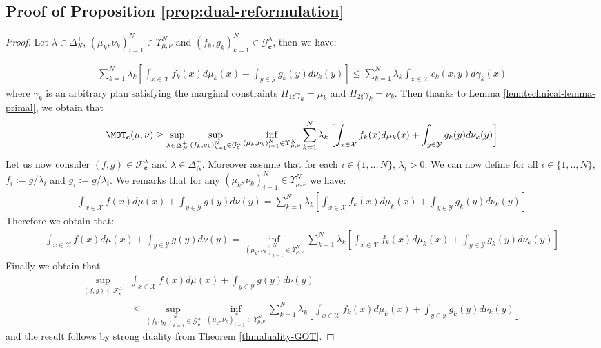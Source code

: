 \subsection{Proof of Proposition \ref{prop:dual-reformulation}}
\label{app:dual-reformulation}
\begin{proof}
Let $\lambda\in\Delta_N^{+}$, $(\mu_k,\nu_k)_{i=1}^N\in\Upsilon_{\mu,\nu}^N$ and $(f_k,g_k)_{k=1}^N\in  \mathcal{G}^{\lambda}_{\mathbf{c}}$, then we have:

\begin{align*}
    \sum_{k=1}^N \lambda_k \left[\int_{x\in\mathcal{X}} f_k(x)d\mu_k(x)+ \int_{y\in\mathcal{Y}} g_k(y)d\nu_k(y)\right] \leq   \sum_{k=1}^N \lambda_k \int_{x\in\mathcal{X}} c_k(x,y)d\gamma_k(x)
\end{align*}
where $\gamma_k$ is an arbitrary plan satisfying the marginal constraints $\Pi_{1\sharp}\gamma_k=\mu_k$ and $\Pi_{2\sharp}\gamma_k=\nu_k$.
Then thanks to Lemma \ref{lem:technical-lemma-primal}, we obtain that 
\begin{align*}
   \MOT_{\mathbf{c}}(\mu,\nu) \geq \sup_{\lambda\in\Delta_N^{+}} \sup\limits_{(f_k,g_k)_{k=1}^N\in  \mathcal{G}^{\lambda}_{\mathbf{c}}} \inf_{(\mu_k,\nu_k)_{i=1}^N\in\Upsilon_{\mu,\nu}^N } \sum_{k=1}^N \lambda_k \left[\int_{x\in\mathcal{X}} f_k(x)d\mu_k(x)+ \int_{y\in\mathcal{Y}} g_k(y)d\nu_k(y)\right]
\end{align*}
Let us now consider $(f,g)\in \mathcal{F}^{\lambda}_{\mathbf{c}}$ and $\lambda\in\Delta_N^{+}$. Moreover assume that for each $i\in\{1,..,N\}$, $\lambda_i>0$. We can now define for all $i\in\{1,..,N\}$, $f_i:= g/\lambda_i$ and $g_i:= g/\lambda_i$. We remarks that for any $(\mu_k,\nu_k)_{i=1}^N\in\Upsilon_{\mu,\nu}^N$ we have:
\begin{align*}
    \int_{x\in\mathcal{X}} f(x)d\mu(x)+ \int_{y\in\mathcal{Y}} g(y)d\nu(y) = \sum_{k=1}^N \lambda_k \left[\int_{x\in\mathcal{X}} f_k(x)d\mu_k(x)+ \int_{y\in\mathcal{Y}} g_k(y)d\nu_k(y)\right]
\end{align*}
Therefore we obtain that:
\begin{align*}
    \int_{x\in\mathcal{X}} f(x)d\mu(x)+ \int_{y\in\mathcal{Y}} g(y)d\nu(y) = \inf_{(\mu_k,\nu_k)_{i=1}^N\in\Upsilon_{\mu,\nu}^N } \sum_{k=1}^N \lambda_k \left[\int_{x\in\mathcal{X}} f_k(x)d\mu_k(x)+ \int_{y\in\mathcal{Y}} g_k(y)d\nu_k(y)\right]
\end{align*}
Finally we obtain that 
\begin{align*}
   \sup\limits_{(f,g)\in\mathcal{F}_{\mathbf{c}}^{\lambda}}& \int_{x\in\mathcal{X}} f(x)d\mu(x)+ \int_{y\in\mathcal{Y}} g(y)d\nu(y)\\
   &\leq \sup\limits_{(f_k,g_k)_{k=1}^N\in  \mathcal{G}^{\lambda}_{\mathbf{c}}} \inf_{(\mu_k,\nu_k)_{i=1}^N\in\Upsilon_{\mu,\nu}^N } \sum_{k=1}^N \lambda_k \left[\int_{x\in\mathcal{X}} f_k(x)d\mu_k(x)+ \int_{y\in\mathcal{Y}} g_k(y)d\nu_k(y)\right]
\end{align*}
 and the result follows by strong duality from Theorem \ref{thm:duality-GOT}.
\end{proof}

